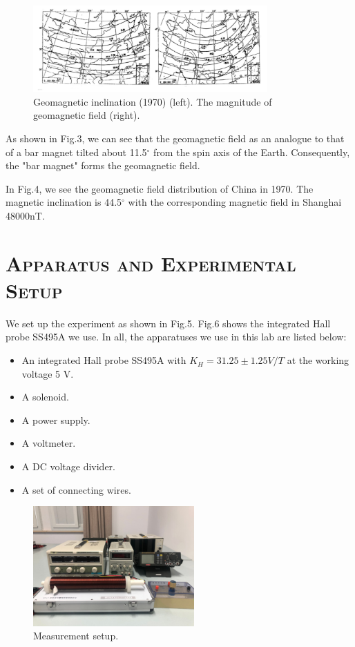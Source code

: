 \documentclass[a4paper,12pt]{article}
\begin{document}
\begin{figure}[htb] 
    \centering
    \includegraphics[width=0.8\textwidth]{Fig4} 
    \caption{Geomagnetic inclination (1970) (left). The magnitude of geomagnetic field (right).\cite{labmanual}} 
\end{figure}
As shown in Fig.3, we can see that the geomagnetic field as an analogue to that of a bar magnet tilted about 11.5$^{\circ}$ from the spin axis of the Earth. Consequently, the "bar magnet" forms the geomagnetic field.

In Fig.4, we see the geomagnetic field distribution of China in 1970. The magnetic inclination is 44.5$^{\circ}$ with the corresponding magnetic field in Shanghai 48000nT.
\section{\textsc{Apparatus and Experimental Setup}}
We set up the experiment as shown in Fig.5. Fig.6 shows the integrated Hall probe SS495A we use. In all, the apparatuses we use in this lab are listed below:
\begin{itemize}
\item An integrated Hall probe SS495A with $K_H = 31.25 \pm 1.25 V/T$ at the working voltage 5 V.
\item A solenoid.
\item A power supply.
\item A voltmeter.
\item A DC voltage divider.
\item A set of connecting wires.
\end{itemize}
\begin{figure}[H] 
    \centering
    \includegraphics[width=0.55\textwidth]{Fig5} 
    \caption{Measurement setup.\cite{labmanual}} 
\end{figure}
\end{document}
